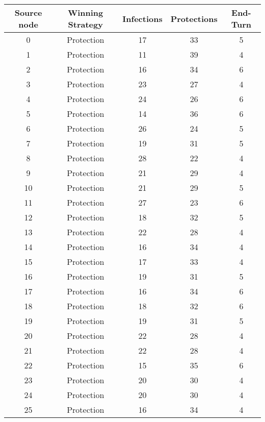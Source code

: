 \documentclass[results.tex]{subfiles}
\begin{document}
\begin{center}
  \begin{tabular}{| c || c | c | c | c |}
    \hline
    {\bfseries Source node} & {\bfseries Winning Strategy} & {\bfseries Infections} & {\bfseries Protections} & {\bfseries End-Turn} \\  %
    \hline\hline
    0 & Protection & 17 & 33 & 5 \\ 
    \hline
    1 & Protection & 11 & 39 & 4 \\ 
    \hline
    2 & Protection & 16 & 34 & 6 \\ 
    \hline
    3 & Protection & 23 & 27 & 4 \\ 
    \hline
    4 & Protection & 24 & 26 & 6 \\ 
    \hline
    5 & Protection & 14 & 36 & 6 \\ 
    \hline
    6 & Protection & 26 & 24 & 5 \\ 
    \hline
    7 & Protection & 19 & 31 & 5 \\ 
    \hline
    8 & Protection & 28 & 22 & 4 \\ 
    \hline
    9 & Protection & 21 & 29 & 4 \\ 
    \hline
    10 & Protection & 21 & 29 & 5 \\ 
    \hline
    11 & Protection & 27 & 23 & 6 \\ 
    \hline
    12 & Protection & 18 & 32 & 5 \\ 
    \hline
    13 & Protection & 22 & 28 & 4 \\ 
    \hline
    14 & Protection & 16 & 34 & 4 \\ 
    \hline
    15 & Protection & 17 & 33 & 4 \\ 
    \hline
    16 & Protection & 19 & 31 & 5 \\ 
    \hline
    17 & Protection & 16 & 34 & 6 \\ 
    \hline
    18 & Protection & 18 & 32 & 6 \\ 
    \hline
    19 & Protection & 19 & 31 & 5 \\ 
    \hline
    20 & Protection & 22 & 28 & 4 \\ 
    \hline
    21 & Protection & 22 & 28 & 4 \\ 
    \hline
    22 & Protection & 15 & 35 & 6 \\ 
    \hline
    23 & Protection & 20 & 30 & 4 \\ 
    \hline
    24 & Protection & 20 & 30 & 4 \\ 
    \hline
    25 & Protection & 16 & 34 & 4 \\ 

\end{tabular}
\end{center}
\end{document}
